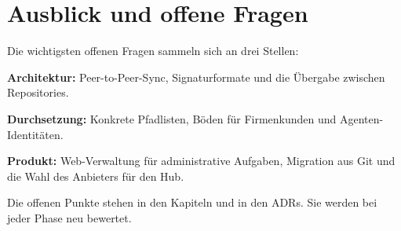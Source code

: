 \chapter{Ausblick und offene Fragen}

Die wichtigsten offenen Fragen sammeln sich an drei Stellen:

\startitemize
\item \textbf{Architektur:} Peer-to-Peer-Sync, Signaturformate und die Übergabe zwischen Repositories.
\item \textbf{Durchsetzung:} Konkrete Pfadlisten, Böden für Firmenkunden und Agenten-Identitäten.
\item \textbf{Produkt:} Web-Verwaltung für administrative Aufgaben, Migration aus Git und die Wahl des Anbieters für den Hub.
\stopitemize

Die offenen Punkte stehen in den Kapiteln und in den ADRs. Sie werden bei jeder Phase neu bewertet.
